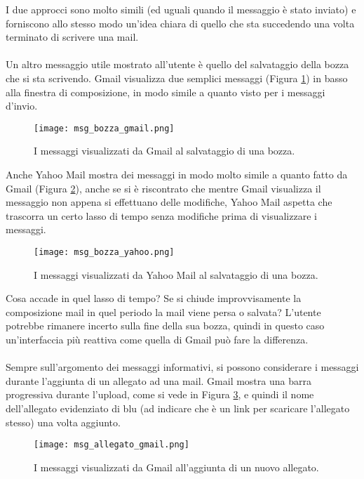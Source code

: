 		I due approcci sono molto simili (ed uguali quando il messaggio è stato inviato) e forniscono allo stesso modo un'idea chiara di quello che sta succedendo una volta terminato di scrivere una mail.\\
		\\
		Un altro messaggio utile mostrato all'utente è quello del salvataggio della bozza che si sta scrivendo. Gmail visualizza due semplici messaggi (Figura \ref{fig:msg_bozza_gmail}) in basso alla finestra di composizione, in modo simile a quanto visto per i messaggi d'invio.
		\begin{figure}[h!]
			\begin{center}
				\texttt{[image: msg\_bozza\_gmail.png]}
			\end{center}
			\caption[Messaggi di salvataggio bozza in Gmail]{I messaggi visualizzati da Gmail al salvataggio di una bozza.}
			\label{fig:msg_bozza_gmail}
		\end{figure}
		
		Anche Yahoo Mail mostra dei messaggi in modo molto simile a quanto fatto da Gmail (Figura \ref{fig:msg_bozza_yahoo}), anche se si è riscontrato che mentre Gmail visualizza il messaggio non appena si effettuano delle modifiche, Yahoo Mail aspetta che trascorra un certo lasso di tempo senza modifiche prima di visualizzare i messaggi.
		\begin{figure}[h!]
			\begin{center}
				\texttt{[image: msg\_bozza\_yahoo.png]}
			\end{center}
			\caption[Messaggi di salvataggio bozza in Yahoo Mail]{I messaggi visualizzati da Yahoo Mail al salvataggio di una bozza.}
			\label{fig:msg_bozza_yahoo}
		\end{figure}
		
		Cosa accade in quel lasso di tempo? Se si chiude improvvisamente la composizione mail in quel periodo la mail viene persa o salvata? L'utente potrebbe rimanere incerto sulla fine della sua bozza, quindi in questo caso un'interfaccia più reattiva come quella di Gmail può fare la differenza.\\
		\\
		Sempre sull'argomento dei messaggi informativi, si possono considerare i messaggi durante l'aggiunta di un allegato ad una mail. Gmail mostra una barra progressiva durante l'upload, come si vede in Figura \ref{fig:msg_allegato_gmail}, e quindi il nome dell'allegato evidenziato di blu (ad indicare che è un link per scaricare l'allegato stesso) una volta aggiunto.
		\begin{figure}[h!]
			\begin{center}
				\texttt{[image: msg\_allegato\_gmail.png]}
			\end{center}
			\caption[Messaggi all'aggiunta di un allegato in Gmail]{I messaggi visualizzati da Gmail all'aggiunta di un nuovo allegato.}
			\label{fig:msg_allegato_gmail}
		\end{figure}
		
